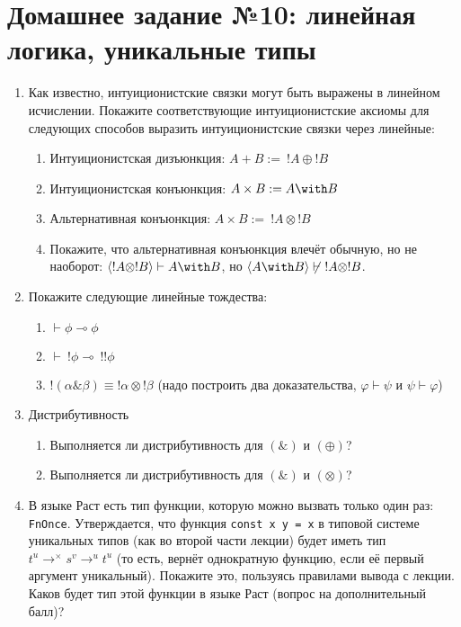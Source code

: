 \documentclass[10pt,a4paper,oneside]{article}
\begin{document}
\section*{Домашнее задание №10: линейная логика, уникальные типы}
\begin{enumerate}
\item Как известно, интуиционистские связки могут быть выражены в линейном исчислении.
Покажите соответствующие интуиционистские аксиомы для следующих способов выразить интуиционистские связки
через линейные:
\begin{enumerate}
\item Интуиционистская дизъюнкция: $A + B :=\ !A \oplus !B$
\item Интуиционистская конъюнкция: $A \times B := A \with B$
\item Альтернативная конъюнкция: $A \times B :=\ !A \otimes !B$ 
\item Покажите, что альтернативная конъюнкция влечёт обычную, но не наоборот: $\langle!A \otimes !B\rangle \vdash A \with B$,
но $\langle A \with B\rangle \not\vdash \ !A \otimes !B$.
\end{enumerate}

\item Покажите следующие линейные тождества:
\begin{enumerate}
\item $\vdash \phi \multimap \phi$
\item $\vdash \ !\phi \multimap \ !!\phi$
\item $!(\alpha\&\beta) \equiv !\alpha\otimes!\beta$ (надо построить два доказательства, $\varphi\vdash\psi$ и $\psi\vdash\varphi$)
\end{enumerate}

\item Дистрибутивность
\begin{enumerate}
\item Выполняется ли дистрибутивность для $(\&)$ и $(\oplus)$?
\item Выполняется ли дистрибутивность для $(\&)$ и $(\otimes)$?
\end{enumerate}

\item В языке Раст есть тип функции, которую можно вызвать только один раз: \verb!FnOnce!.
Утверждается, что функция \verb!const x y = x! в типовой системе уникальных типов (как во второй части лекции) 
будет иметь тип $t^u \rightarrow^\times s^v \rightarrow^u t^u$ (то есть, вернёт
однократную функцию, если её первый аргумент уникальный). Покажите это, пользуясь правилами вывода
с лекции. Каков будет тип этой функции в языке Раст (вопрос на дополнительный балл)?


\end{enumerate}
\end{document}
